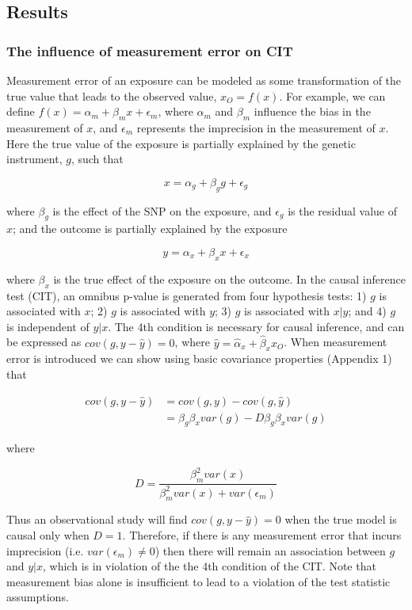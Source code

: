 \documentclass[]{article}
\begin{document}
\subsection{Results}\label{results}

\subsubsection{The influence of measurement error on
CIT}\label{the-influence-of-measurement-error-on-cit}

Measurement error of an exposure can be modeled as some transformation
of the true value that leads to the observed value, \(x_O=f(x)\). For
example, we can define \(f(x) = \alpha_m + \beta_m x + \epsilon_m\),
where \(\alpha_m\) and \(\beta_m\) influence the bias in the measurement
of \(x\), and \(\epsilon_m\) represents the imprecision in the
measurement of \(x\). Here the true value of the exposure is partially
explained by the genetic instrument, \(g\), such that

\[
x = \alpha_g + \beta_g g + \epsilon_g
\]

where \(\beta_g\) is the effect of the SNP on the exposure, and
\(\epsilon_g\) is the residual value of \(x\); and the outcome is
partially explained by the exposure

\[
y = \alpha_x + \beta_x x + \epsilon_x
\]

where \(\beta_x\) is the true effect of the exposure on the outcome. In
the causal inference test (CIT), an omnibus p-value is generated from
four hypothesis tests: 1) \(g\) is associated with \(x\); 2) \(g\) is
associated with \(y\); 3) \(g\) is associated with \(x|y\); and 4) \(g\)
is independent of \(y|x\). The 4th condition is necessary for causal
inference, and can be expressed as \(cov(g, y - \hat{y}) = 0\), where
\(\hat{y} = \hat{\alpha}_x + \hat{\beta}_x x_O\). When measurement error
is introduced we can show using basic covariance properties (Appendix 1)
that

\[
\begin{aligned}
cov(g, y - \hat{y}) & = cov(g, y) - cov(g, \hat{y})  \\
                    & = \beta_g \beta_x var(g) - D\beta_g \beta_x var(g)
\end{aligned}
\]

where

\[
D = \frac{\beta^2_m var(x)} {\beta^2_m var(x) + var(\epsilon_m)}
\]

Thus an observational study will find \(cov(g, y - \hat{y}) = 0\) when
the true model is causal only when \(D = 1\). Therefore, if there is any
measurement error that incurs imprecision (i.e.
\(var(\epsilon_m) \neq 0\)) then there will remain an association
between \(g\) and \(y|x\), which is in violation of the the 4th
condition of the CIT. Note that measurement bias alone is insufficient
to lead to a violation of the test statistic assumptions.
\end{document}
